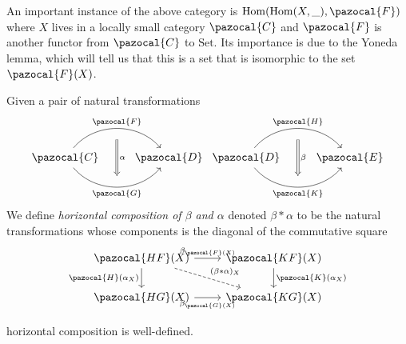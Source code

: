 An important instance of the above category is $\Hom(\Hom(X,\_),\pazocal{F})$ where $X$ lives in a locally small category $\pazocal{C}$ and $\pazocal{F}$ is another functor from $\pazocal{C}$ to $\mathrm{Set}$. Its importance is due to the Yoneda lemma, which will tell us that this is a set that is isomorphic to the set $\pazocal{F}(X)$.  
\begin{definition}
    Given a pair of natural transformations
    $$
        \begin{tikzcd}
            \pazocal{C} \arrow[r,bend left = 50, "\pazocal{F}"{name=F}] \arrow[r, bend right = 50, "\pazocal{G}"{name=G},swap] & \pazocal{D}  \arrow[Rightarrow,from=F, to=G,"\alpha", shorten <= 10pt, shorten >= 10 pt]
        \end{tikzcd}
        \begin{tikzcd}
            \pazocal{D} \arrow[r,bend left = 50, "\pazocal{H}"{name=F}] \arrow[r, bend right = 50, "\pazocal{K}"{name=G},swap] & \pazocal{E}  \arrow[Rightarrow,from=F, to=G,"\beta", shorten <= 10pt, shorten >= 10 pt]
        \end{tikzcd}
    $$
    We define \emph{horizontal composition of $\beta$ and $\alpha$} denoted $\beta\ast\alpha$ to be the natural transformations whose components is the diagonal of the commutative square
    $$
        \begin{tikzcd}
            \pazocal{HF}(X) \arrow[rd, dashed, "(\beta\ast \alpha)_X"] \arrow[r,"\beta_{\pazocal{F}(X)}"] \arrow[d,"\pazocal{H}(\alpha_X)",swap] & \pazocal{KF}(X)\arrow[d,"\pazocal{K}(\alpha_X)"]\\
            \pazocal{HG}(X) \arrow[r,"\beta_{\pazocal{G}(X)}",swap] & \pazocal{KG}(X)
        \end{tikzcd}
    $$
\end{definition}
\begin{proposition}
    horizontal composition is well-defined.
\end{proposition}
